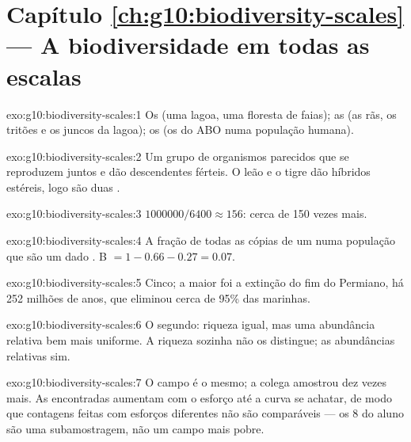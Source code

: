 \section*{Capítulo \ref{ch:g10:biodiversity-scales} --- A biodiversidade em todas as escalas}

\begin{solution}{exo:g10:biodiversity-scales:1}
Os  (uma lagoa, uma floresta de faias); as  (as
rãs, os tritões e os juncos da lagoa); os  (os  do  ABO
numa população humana).
\end{solution}

\begin{solution}{exo:g10:biodiversity-scales:2}
Um grupo de organismos parecidos que se reproduzem juntos e dão
descendentes férteis. O leão e o tigre dão híbridos estéreis, logo são
duas .
\end{solution}

\begin{solution}{exo:g10:biodiversity-scales:3}
$\num{1000000}/6400 \approx 156$: cerca de 150 vezes mais.
\end{solution}

\begin{solution}{exo:g10:biodiversity-scales:4}
A fração de todas as cópias de um  numa população que são um dado
. B $= 1 - 0.66 - 0.27 = 0.07$.
\end{solution}

\begin{solution}{exo:g10:biodiversity-scales:5}
Cinco; a maior foi a extinção do fim do Permiano, há 252 milhões de
anos, que eliminou cerca de 95\% das  marinhas.
\end{solution}

\begin{solution}{exo:g10:biodiversity-scales:6}
O segundo: riqueza igual, mas uma abundância relativa bem mais
uniforme. A riqueza sozinha não os distingue; as abundâncias relativas
sim.
\end{solution}

\begin{solution}{exo:g10:biodiversity-scales:7}
O campo é o mesmo; a colega amostrou dez vezes mais. As 
encontradas aumentam com o esforço até a curva se achatar, de modo que
contagens feitas com esforços diferentes não são comparáveis --- os 8
do aluno são uma subamostragem, não um campo mais pobre.
\end{solution}


